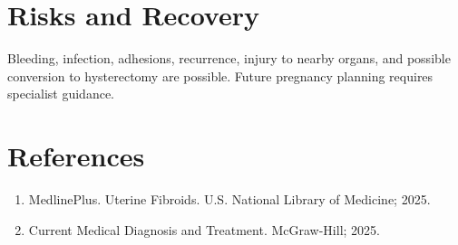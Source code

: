 \section*{Risks and Recovery}
Bleeding, infection, adhesions, recurrence, injury to nearby organs, and possible conversion to hysterectomy are possible. Future pregnancy planning requires specialist guidance.
\section*{References}
\begin{enumerate}\item MedlinePlus. Uterine Fibroids. U.S. National Library of Medicine; 2025.\item Current Medical Diagnosis and Treatment. McGraw-Hill; 2025.\end{enumerate}
\clearpage
